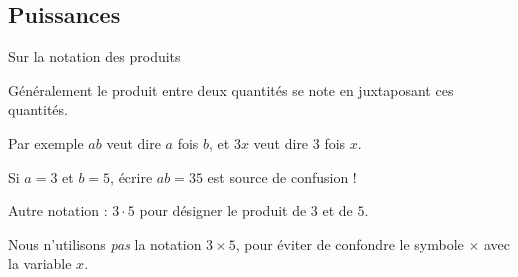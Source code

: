 \subsection{Puissances}\label{sec-puissances}
\begin{frame}{Sur la notation des produits}
  \begin{block}{}
    Généralement le produit entre deux quantités se note en juxtaposant ces quantités.
  \end{block}

  \begin{example}
    Par exemple \(ab\) veut dire \og \(a\) fois \(b\)\fg{}, et \(3 x\) veut dire \og \(3\) fois \(x\)\fg{}.
  \end{example}\pause

  \begin{example}
    Si \(a = 3\) et \(b = 5\), écrire \(ab = 35\) est source de confusion !\pause
      
    Autre notation : \(3\cdot 5\) pour désigner le produit de \(3\) et de \(5\).

    Nous n'utilisons \emph{pas} la notation \(3\times 5\), pour éviter de confondre le symbole \(\times\) avec la variable \(x\).
  \end{example}
\end{frame}

